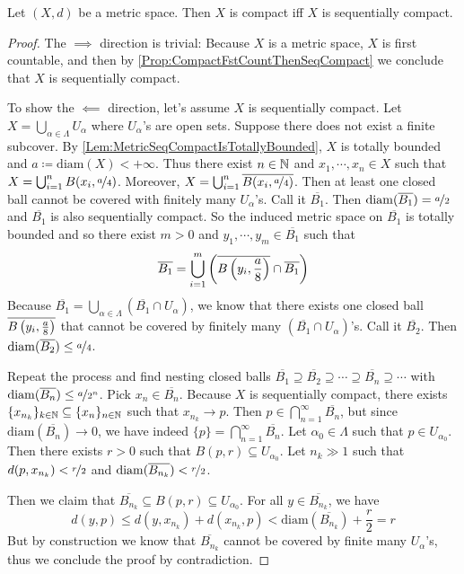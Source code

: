 \documentclass[screen,single]{techreport}
\numberwithin{equation}{section}
\begin{document}
\begin{proposition}\label{Prop:MetricCompactIffSeqCompact}
	Let $(X,d)$ be a metric space.
	Then $X$ is compact iff $X$ is sequentially compact.
\end{proposition}
\begin{proof}
	The ${\implies}$ direction is trivial: Because $X$ is a metric space, $X$ is first countable, and then by \cref{Prop:CompactFstCountThenSeqCompact} we conclude that $X$ is sequentially compact.
	
	To show the ${\impliedby}$ direction, let's assume $X$ is sequentially compact.
	Let $X = \bigcup_{\alpha \in \Lambda} U_\alpha$ where $U_\alpha$'s are open sets.
	Suppose there does not exist a finite subcover.
	By \cref{Lem:MetricSeqCompactIsTotallyBounded}, $X$ is totally bounded and $a	\coloneqq \mathrm{diam}(X) < +\infty$.
	Thus there exist $n \in \mathbb{N}$ and $x_1,\cdots,x_n \in X$ such that $X = \bigcup_{i=1}^n B(x_i, \nicefrac{a}{4})$.
	Moreover, $X = \bigcup_{i=1}^n \overline{B(x_i, \nicefrac{a}{4})}$.
	Then at least one closed ball cannot be covered with finitely many $U_\alpha$'s.
	Call it $\overline{B_1}$. Then $\mathrm{diam}(\overline{B_1}) = \nicefrac{a}{2}$ and $\overline{B_1}$ is also sequentially compact.
	So the induced metric space on $\overline{B_1}$ is totally bounded and so there exist $m > 0$ and $y_1,\cdots,y_m \in \overline{B_1}$ such that
	\[
	\overline{B_1} = \bigcup_{i=1}^m\left({ \overline{B\left({y_i,\frac{a}{8}}\right)} \cap \overline{B_1} }\right)
	\]
	Because $\overline{B_1}=\bigcup_{\alpha \in \Lambda} (\overline{B_1} \cap U_\alpha)$, we know that there exists one closed ball $\overline{B\left({y_i,\frac{a}{8}}\right)}$ that cannot be covered by finitely many $(\overline{B_1} \cap U_\alpha)$'s.
	Call it $\overline{B_2}$. Then $\mathrm{diam}(\overline{B_2}) \le \nicefrac{a}{4}$.
	
	Repeat the process and find nesting closed balls $\overline{B_1} \supseteq \overline{B_2} \supseteq \cdots \supseteq \overline{B_n} \supseteq \cdots$ with $\mathrm{diam}(\overline{B_n}) \le \nicefrac{a}{2^n}$.
	Pick $x_n \in \overline{B_n}$.
	Because $X$ is sequentially compact, there exists $\{x_{n_k}\}_{k \in \mathbb{N}} \subseteq \{x_n\}_{n \in \mathbb{N}}$ such that $x_{n_k} \rightarrow p$.
	Then $p \in \bigcap_{n=1}^\infty \overline{B_n}$, but since $\mathrm{diam}(\overline{B_n}) \rightarrow 0$, we have indeed $\{p\} = \bigcap_{n=1}^\infty \overline{B_n}$.
	Let $\alpha_0 \in \Lambda$ such that $p \in U_{\alpha_0}$.
	Then there exists $r > 0$ such that $B(p,r) \subseteq U_{\alpha_0}$.
	Let $n_k \gg 1$ such that $d(p,x_{n_k}) < \nicefrac{r}{2}$ and $\mathrm{diam}(\overline{B_{n_k}}) < \nicefrac{r}{2}$.
	
	Then we claim that $\overline{B_{n_k}} \subseteq B(p,r) \subseteq U_{\alpha_0}$.
	For all $y \in \overline{B_{n_k}}$, we have
	\[
	d(y,p) \le d(y,x_{n_k}) + d(x_{n_k}, p) < \mathrm{diam}(\overline{B_{n_k}}) + \frac{r}{2} = r
	\]
	But by construction we know that $\overline{B_{n_k}}$ cannot be covered by finite many $U_\alpha$'s, thus we conclude the proof by contradiction.
\end{proof}
\end{document}

